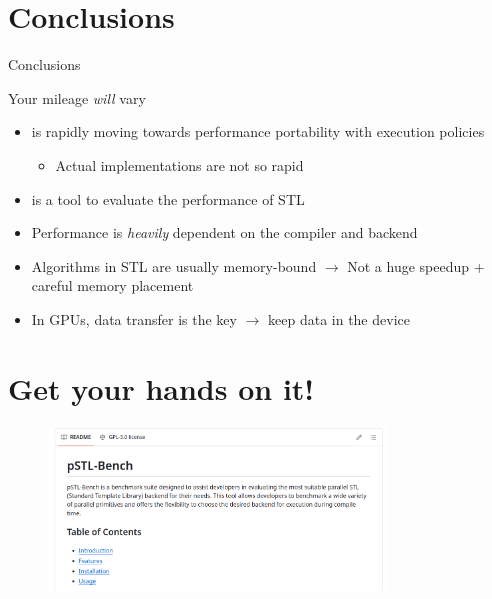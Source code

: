 \documentclass[aspectratio=169]{beamer}
\newenvironment{blockitem}[1]{\begin{block}{#1}\begin{itemize}}{\end{itemize}\end{block}}
\newenvironment{xframe}[1][]%
	{\begin{frame}[fragile, environment=xframe, #1]{\secname}}%
	{\end{frame}}
\begin{document}
\section*{Conclusions}
\begin{frame}{Conclusions}
	\begin{blockitem}{Your mileage \textit{will} vary}
		\item \langcpp is rapidly moving towards performance portability with execution policies
		\begin{itemize}
			\item Actual implementations are not so rapid
		\end{itemize}
		\item \pstlbench is a tool to evaluate the performance of \langcpp STL
		\item Performance is \emph{heavily} dependent on the compiler and backend
		\item Algorithms in STL are usually memory-bound $\rightarrow$ Not a huge speedup + careful memory placement
		\item In GPUs, data transfer is the key $\rightarrow$ keep data in the device
	\end{blockitem}
\end{frame}

\section*{Get your hands on it!}

\begin{xframe}
	\begin{figure}
		\centering
		\caption*{}
		\includegraphics[width=0.8\textwidth]{images/github-pstl.png}
	\end{figure}
\end{xframe}

\end{document}
